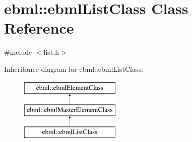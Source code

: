 \hypertarget{classebml_1_1ebmlListClass}{}\section{ebml\+:\+:ebml\+List\+Class Class Reference}
\label{classebml_1_1ebmlListClass}


{\ttfamily \#include $<$list.\+h$>$}

Inheritance diagram for ebml\+:\+:ebml\+List\+Class\+:\begin{figure}[H]
\begin{center}
\leavevmode
\includegraphics[height=3.000000cm]{classebml_1_1ebmlListClass}
\end{center}
\end{figure}
